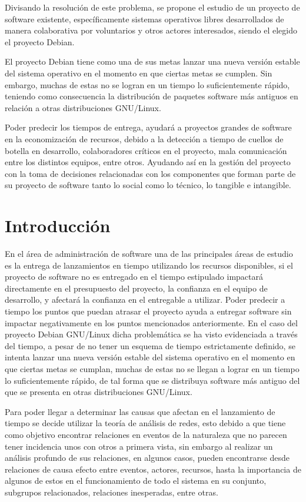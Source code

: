 \documentclass[12pt,titlepage]{report}
\begin{document}
Divisando la resolución de este problema, se propone el estudio de un
proyecto de software existente, específicamente sistemas operativos
libres desarrollados de manera colaborativa por voluntarios y otros
actores interesados, siendo el elegido el proyecto Debian.

El proyecto Debian tiene como una de sus metas lanzar una nueva
versión estable del sistema operativo en el momento en que ciertas
metas se cumplen.  Sin embargo, muchas de estas no se logran en un
tiempo lo suficientemente rápido, teniendo como consecuencia la
distribución de paquetes software más antiguos en relación a otras
distribuciones GNU/Linux.

Poder predecir los tiempos de entrega, ayudará a proyectos grandes de
software en la economización de recursos, debido a la detección a
tiempo de cuellos de botella en desarrollo, colaboradores críticos en
el proyecto, mala comunicación entre los distintos equipos, entre
otros.  Ayudando así en la gestión del proyecto con la toma de
decisiones relacionadas con los componentes que forman parte de su
proyecto de software tanto lo social como lo técnico, lo tangible e
intangible.

\chapter{Introducción}
En el área de administración de software una de las principales áreas
de estudio es la entrega de lanzamientos en tiempo utilizando los
recursos disponibles, si el proyecto de software no es entregado en el
tiempo estipulado impactará directamente en el presupuesto del
proyecto, la confianza en el equipo de desarrollo, y afectará la
confianza en el entregable a utilizar. Poder predecir a tiempo los
puntos que puedan atrasar el proyecto ayuda a entregar software sin
impactar negativamente en los puntos mencionados anteriormente.  En el
caso del proyecto Debian GNU/Linux dicha problemática se ha visto
evidenciada a través del tiempo, a pesar de no tener un esquema de
tiempo estrictamente definido, se intenta lanzar una nueva versión
estable del sistema operativo en el momento en que ciertas metas se
cumplan, muchas de estas no se llegan a lograr en un tiempo lo
suficientemente rápido, de tal forma que se distribuya software más
antiguo del que se presenta en otras distribuciones GNU/Linux.

Para poder llegar a determinar las causas que afectan en el
lanzamiento de tiempo se decide utilizar la teoría de análisis de
redes, esto debido a que tiene como objetivo encontrar relaciones en
eventos de la naturaleza que no parecen tener incidencia unos con
otros a primera vista, sin embargo al realizar un análisis profundo de
sus relaciones, en algunos casos, pueden encontrarse desde relaciones
de causa efecto entre eventos, actores, recursos, hasta la importancia
de algunos de estos en el funcionamiento de todo el sistema en su
conjunto, subgrupos relacionados, relaciones inesperadas, entre otras.
\end{document}
